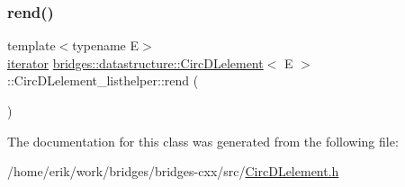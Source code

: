 \mbox{\label{classbridges_1_1datastructure_1_1_circ_d_lelement_1_1_circ_d_lelement__listhelper_a0d26c54b82fcd733dcb445e0c39dc28e}} 
\subsubsection{\texorpdfstring{rend()}{rend()}}
{\footnotesize\ttfamily template$<$typename E$>$ \\
\hyperlink{classbridges_1_1datastructure_1_1_circ_d_lelement_1_1_circ_d_lelement__listhelper_1_1iterator}{iterator} \hyperlink{classbridges_1_1datastructure_1_1_circ_d_lelement}{bridges\+::datastructure\+::\+Circ\+D\+Lelement}$<$ E $>$\+::Circ\+D\+Lelement\+\_\+listhelper\+::rend (\begin{DoxyParamCaption}{ }\end{DoxyParamCaption})\hspace{0.3cm}{\ttfamily [inline]}}



The documentation for this class was generated from the following file\+:\begin{DoxyCompactItemize}
\item 
/home/erik/work/bridges/bridges-\/cxx/src/\hyperlink{_circ_d_lelement_8h}{Circ\+D\+Lelement.\+h}\end{DoxyCompactItemize}
